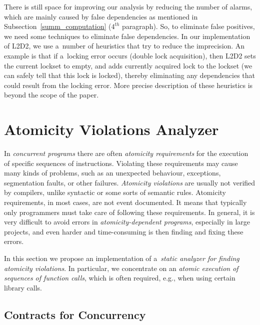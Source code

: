 \documentclass{ExcelAtFIT}
\begin{document}
There is still space for improving our analysis by reducing the number of alarms, which are mainly caused by false dependencies as mentioned in Subsection~\ref{summ_computation} ($4^{th}$ paragraph). So, to eliminate false positives, we need some techniques to eliminate false dependencies. In our implementation of L2D2, we use a~number of heuristics that try to reduce the imprecision. An example is that if a~locking error occurs (double lock acquisition), then L2D2 sets the current lockset to empty, and adds currently acquired lock to the lockset (we can safely tell that this lock is locked), thereby eliminating any dependencies that could result from the locking error. More precise description of these heuristics is beyond the scope of the paper.

\section{Atomicity Violations Analyzer}

In \emph{concurrent programs} there are often
\emph{atomicity requirements} for the execution of specific
sequences of instructions. Violating these requirements
may cause many kinds of problems, such as an unexpected
behaviour, exceptions, segmentation faults, or other
failures. \emph{Atomicity violations} are usually not
verified by compilers, unlike syntactic or some sorts
of semantic rules. Atomicity requirements,
in most cases, are not event documented. It means
that typically only programmers must take care of
following these requirements. In general, it is very
difficult to avoid errors in \emph{atomicity-dependent
programs}, especially in large projects, and even harder
and time-consuming is then finding and fixing these errors.

In this section we propose
an implementation of a~\emph{static analyzer for
finding atomicity violations}. In particular,
we concentrate on an \emph{atomic execution
of sequences of function calls}, which is often
required, e.g., when using certain library calls.

\subsection{Contracts for Concurrency}
\label{sec:contracts}
\end{document}

